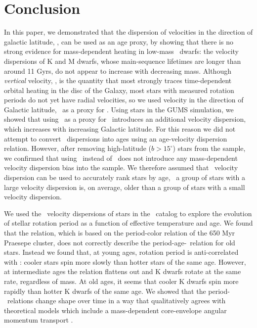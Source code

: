 \section{Conclusion}

In this paper, we demonstrated that the dispersion of velocities in the
direction of galactic latitude, \vb, can be used as an age proxy, by showing
that there is no strong evidence for mass-dependent heating in low-mass
\kepler\ dwarfs: the velocity dispersions of K and M dwarfs, whose
main-sequence lifetimes are longer than around 11 Gyrs, do not appear to
increase with decreasing mass.
Although {\it vertical} velocity, \vz, is the quantity that most strongly
traces time-dependent orbital heating in the disc of the Galaxy, most stars
with measured rotation periods do not yet have radial velocities, so we used
velocity in the direction of Galactic latitude, \vb\, as a proxy for \vz.
Using stars in the GUMS simulation, we showed that using \vb\ as a proxy for
\vz\ introduces an additional velocity dispersion, which increases with
increasing Galactic latitude.
For this reason we did not attempt to convert \vb\ dispersions into ages using
an age-velocity dispersion relation.
However, after removing high-latitude ($b>15^\circ$) stars from the sample, we
confirmed that using \vb\ instead of \vz\ does not introduce any
mass-dependent velocity dispersion bias into the sample.
We therefore assumed that \vb\ velocity dispersion can be used to accurately
rank stars by age, \ie\ a group of stars with a large velocity dispersion is,
on average, older than a group of stars with a small velocity dispersion.

We used the \vb\ velocity dispersions of stars in the \mct\ catalog to explore
the evolution of stellar rotation period as a function of effective
temperature and age.
We found that the \citet{angus2019} relation, which is based on the
period-color relation of the 650 Myr Praesepe cluster, does not correctly
describe the period-age-\teff\ relation for old stars.
Instead we found that, at young ages, rotation period is anti-correlated with
\teff: cooler stars spin more slowly than hotter stars of the same age.
However, at intermediate ages the relation flattens out and K dwarfs rotate at
the same rate, regardless of mass.
At old ages, it seems that cooler K dwarfs spin more rapidly than hotter K
dwarfs of the same age.
We showed that the period-\teff\ relations change shape over time in a way
that qualitatively agrees with theoretical models which include a
mass-dependent core-envelope angular momentum transport \citep{spada2019}.

